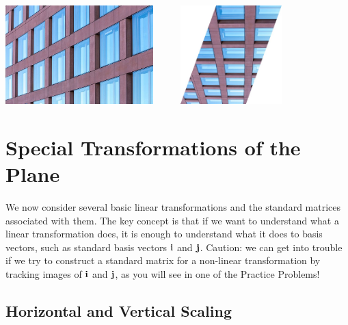 \documentclass{ximera}
\renewcommand{\vec}[1]{{\bf #1}}
\newtheorem{initprob}{Exploration Problem}
\begin{document}
    \begin{center}
         \includegraphics[height=1.5in]{building1.jpg}
~~~~~\includegraphics[height=1.5in]{building2.jpg}
      \end{center}

\section*{Special Transformations of the Plane}
We now consider several basic linear transformations and the standard matrices associated with them.  The key concept is that if we want to understand what a linear transformation does, it is enough to understand what it does to basis vectors, such as standard basis vectors $\vec{i}$ and $\vec{j}$.  Caution: we can get into trouble if we try to construct a standard matrix for a non-linear transformation by tracking images of $\vec{i}$ and $\vec{j}$, as you will see in one of the Practice Problems!  %

\subsection*{Horizontal and Vertical Scaling} 

\end{document}
